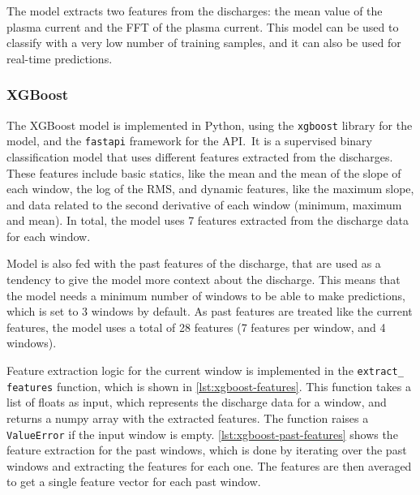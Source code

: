 The model extracts two features from the discharges: the mean value of the plasma current and the \ac{FFT} of the plasma current. This model can be used to classify with a very low number of training samples, and it can also be used for real-time predictions.

\subsubsection{XGBoost}\label{subsubsec:xgboost}

The XGBoost model is implemented in Python, using the \texttt{xgboost} library for the model, and the \texttt{fastapi} framework for the API.\ It is a supervised binary classification model that uses different features extracted from the discharges. These features include basic statics, like the mean and the mean of the slope of each window, the log of the \ac{RMS}, and dynamic features, like the maximum slope, and data related to the second derivative of each window (minimum, maximum and mean). In total, the model uses 7 features extracted from the discharge data for each window.

Model is also fed with the past features of the discharge, that are used as a tendency to give the model more context about the discharge. This means that the model needs a minimum number of windows to be able to make predictions, which is set to 3 windows by default. As past features are treated like the current features, the model uses a total of 28 features (7 features per window, and 4 windows). 

Feature extraction logic for the current window is implemented in the \texttt{extract\_ features} function, which is shown in \autoref{lst:xgboost-features}. This function takes a list of floats as input, which represents the discharge data for a window, and returns a numpy array with the extracted features. The function raises a \texttt{ValueError} if the input window is empty. \autoref{lst:xgboost-past-features} shows the feature extraction for the past windows, which is done by iterating over the past windows and extracting the features for each one. The features are then averaged to get a single feature vector for each past window.

